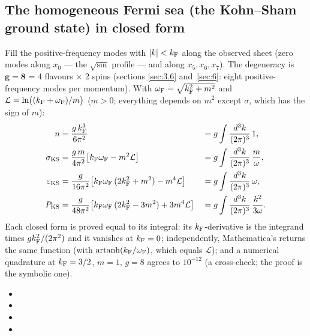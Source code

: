 \subsection{The homogeneous Fermi sea (the Kohn--Sham ground state) in closed form}
\label{sec:8.4}

Fill the positive-frequency modes with $|k|<k_{\mathrm{F}}$ along the observed sheet (zero modes along $x_0$ ---
the $\sqrt{\sin}$ profile --- and along $x_5,x_6,x_7$). The degeneracy is $\boldsymbol{g=8}$ = 4
flavours $\times$ 2 spins (sections \ref{sec:3.6} and~\ref{sec:6}: eight positive-frequency modes per
momentum). With $\omega_{\mathrm{F}}=\sqrt{k_{\mathrm{F}}^2+m^2}$ and $\mathcal L=\ln\bigl((k_{\mathrm{F}}+\omega_{\mathrm{F}})/m\bigr)$ ($m>0$; everything
depends on $m^2$ except $\sigma$, which has the sign of $m$):
\begin{align*}
  n&=\frac{g\,k_{\mathrm{F}}^3}{6\pi^2} &&=g\int\frac{d^3k}{(2\pi)^3}\,1,\\
  \sigma_{\mathrm{KS}}&=\frac{g\,m}{4\pi^2}\bigl[k_{\mathrm{F}}\omega_{\mathrm{F}}-m^2\mathcal L\bigr] &&=g\int\frac{d^3k}{(2\pi)^3}\,\frac m\omega,\\
  \varepsilon_{\mathrm{KS}}&=\frac{g}{16\pi^2}\bigl[k_{\mathrm{F}}\omega_{\mathrm{F}}\,(2k_{\mathrm{F}}^2+m^2)-m^4\mathcal L\bigr] &&=g\int\frac{d^3k}{(2\pi)^3}\,\omega,\\
  P_{\mathrm{KS}}&=\frac{g}{48\pi^2}\bigl[k_{\mathrm{F}}\omega_{\mathrm{F}}\,(2k_{\mathrm{F}}^2-3m^2)+3m^4\mathcal L\bigr] &&=g\int\frac{d^3k}{(2\pi)^3}\,\frac{k^2}{3\omega}.
\end{align*}
Each closed form is proved equal to its integral: its $k_{\mathrm{F}}$-derivative is the integrand times
$gk_{\mathrm{F}}^2/(2\pi^2)$ and it vanishes at $k_{\mathrm{F}}=0$; independently, Mathematica's 
returns the same function (with $\operatorname{artanh}(k_{\mathrm{F}}/\omega_{\mathrm{F}})$, which equals $\mathcal L$); and a
numerical quadrature at $k_{\mathrm{F}}=3/2$, $m=1$, $g=8$ agrees to $10^{-12}$ (a cross-check; the proof is the
symbolic one). 
\begin{itemize}
  \item {}
  \item {}
  \item {}
  \item {}
\end{itemize}

